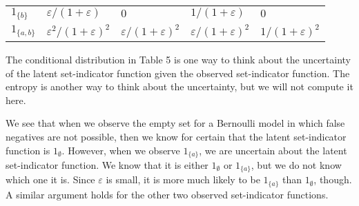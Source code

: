\documentclass[
]{article}
\begin{document}
\begin{longtable}[]{@{}lllll@{}}
\begin{minipage}[t]{0.10\columnwidth}\raggedright
\(1_{\{b\}}\)\strut
\end{minipage} & \begin{minipage}[t]{0.21\columnwidth}\raggedright
\(\varepsilon/(1+\varepsilon)\)\strut
\end{minipage} & \begin{minipage}[t]{0.20\columnwidth}\raggedright
\(0\)\strut
\end{minipage} & \begin{minipage}[t]{0.20\columnwidth}\raggedright
\(1/(1+\varepsilon)\)\strut
\end{minipage} & \begin{minipage}[t]{0.14\columnwidth}\raggedright
\(0\)\strut
\end{minipage}\tabularnewline
\begin{minipage}[t]{0.10\columnwidth}\raggedright
\(1_{\{a,b\}}\)\strut
\end{minipage} & \begin{minipage}[t]{0.21\columnwidth}\raggedright
\(\varepsilon^2/(1+\varepsilon)^2\)\strut
\end{minipage} & \begin{minipage}[t]{0.20\columnwidth}\raggedright
\(\varepsilon/(1+\varepsilon)^2\)\strut
\end{minipage} & \begin{minipage}[t]{0.20\columnwidth}\raggedright
\(\varepsilon/(1+\varepsilon)^2\)\strut
\end{minipage} & \begin{minipage}[t]{0.14\columnwidth}\raggedright
\(1/(1+\varepsilon)^2\)\strut
\end{minipage}\tabularnewline
\bottomrule
\end{longtable}

The conditional distribution in Table 5 is one way to think about the
uncertainty of the latent set-indicator function given the observed
set-indicator function. The entropy is another way to think about the
uncertainty, but we will not compute it here.

We see that when we observe the empty set for a Bernoulli model in which
false negatives are not possible, then we know for certain that the
latent set-indicator function is \(1_\emptyset\). However, when we
observe \(1_{\{a\}}\), we are uncertain about the latent set-indicator
function. We know that it is either \(1_{\emptyset}\) or \(1_{\{a\}}\),
but we do not know which one it is. Since \(\varepsilon\) is small, it
is more much likely to be \(1_{\{a\}}\) than \(1_{\emptyset}\), though.
A similar argument holds for the other two observed set-indicator
functions.
\end{document}
